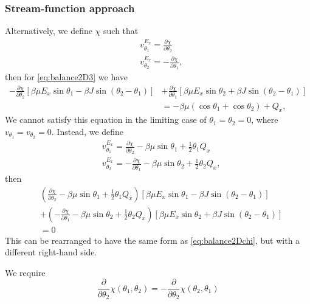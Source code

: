 \documentclass[11pt,reqno]{amsart}
\begin{document}
\subsubsection{Stream-function approach}
Alternatively, we define $\chi$ such that
\begin{subequations}
\label{eq:chiDef}
\begin{align}
&{ v}^{E_x}_{\theta_1}=\frac{\partial \chi}{\partial \theta_2}\\
&{ v}^{E_x}_{\theta_2}=-\frac{\partial \chi}{\partial \theta_1},
\end{align}
\end{subequations}
then for \eqref{eq:balance2D3} we have
\begin{align}
\label{eq:balance2Dchi}
- \frac{\partial \chi}{\partial \theta_2} [\beta\mu E_x \sin\theta_1 - \beta J \sin(\theta_2-\theta_1)]&+ \frac{\partial \chi}{\partial\theta_1} [\beta\mu E_x \sin\theta_2 + \beta J \sin(\theta_2-\theta_1)]\nonumber\\
&= -\beta\mu(\cos\theta_1+\cos\theta_2) + Q_x,
\end{align}
We cannot satisfy this equation in the limiting case of $\theta_1 = \theta_2 = 0$, where $v_{\theta_1} = v_{\theta_2} = 0$. Instead, we define
\begin{subequations}
\label{eq:chiDef2}
\begin{align}
&{ v}^{E_x}_{\theta_1}=\frac{\partial \chi}{\partial \theta_2}-\beta\mu\sin\theta_1 + \frac{1}{2}\theta_1 Q_x\\
&{ v}^{E_x}_{\theta_2}=-\frac{\partial \chi}{\partial \theta_1}-\beta\mu\sin\theta_2 + \frac{1}{2}\theta_2 Q_x,
\end{align}
\end{subequations}
then
\begin{align}
\label{eq:balance2Dchi2}
&\left(\frac{\partial \chi}{\partial \theta_2} -\beta\mu\sin\theta_1 + \frac{1}{2}\theta_1 Q_x\right)[\beta\mu E_x \sin\theta_1 - \beta J \sin(\theta_2-\theta_1)]\nonumber\\
&+ \left(-\frac{\partial \chi}{\partial\theta_1}-\beta\mu\sin\theta_2 + \frac{1}{2}\theta_2 Q_x\right) [\beta\mu E_x \sin\theta_2 + \beta J \sin(\theta_2-\theta_1)]\nonumber\\
&= 0
\end{align}
This can be rearranged to have the same form as \eqref{eq:balance2Dchi}, but with a different right-hand side.

We require
\begin{equation*}
\frac{\partial}{\partial \theta_2}\chi(\theta_1,\theta_2) = -\frac{\partial}{\partial \theta_2}\chi(\theta_2,\theta_1)
\end{equation*}
\end{document}
